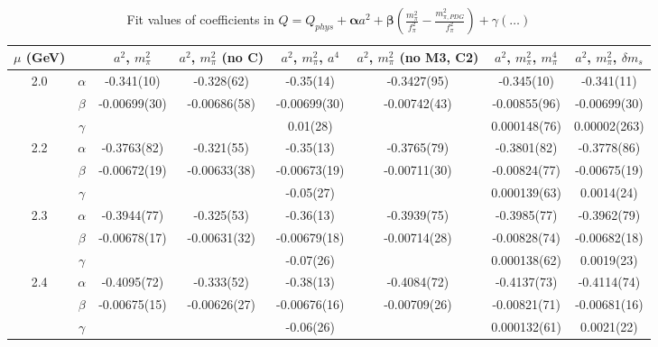 \documentclass[12pt]{extarticle}
\begin{document}
\begin{table}[h!]
\begin{center}
\begin{tabular}{|c c|c|c|c|c|c|c|}
\hline
$\mu$ (GeV) &  & $a^2$, $m_\pi^2$& $a^2$, $m_\pi^2$ (no C)& $a^2$, $m_\pi^2$, $a^4$& $a^2$, $m_\pi^2$ (no M3, C2)& $a^2$, $m_\pi^2$, $m_\pi^4$& $a^2$, $m_\pi^2$, $\delta m_s$\\
\hline
\multirow{3}{0.5in}{2.0} & $\alpha$ & -0.341(10)& -0.328(62)& -0.35(14)& -0.3427(95)& -0.345(10)& -0.341(11)\\
 & $\beta$ & -0.00699(30)& -0.00686(58)& -0.00699(30)& -0.00742(43)& -0.00855(96)& -0.00699(30)\\
 & $\gamma$ &  &  & 0.01(28)&  & 0.000148(76)& 0.00002(263)\\
\hline
\multirow{3}{0.5in}{2.2} & $\alpha$ & -0.3763(82)& -0.321(55)& -0.35(13)& -0.3765(79)& -0.3801(82)& -0.3778(86)\\
 & $\beta$ & -0.00672(19)& -0.00633(38)& -0.00673(19)& -0.00711(30)& -0.00824(77)& -0.00675(19)\\
 & $\gamma$ &  &  & -0.05(27)&  & 0.000139(63)& 0.0014(24)\\
\hline
\multirow{3}{0.5in}{2.3} & $\alpha$ & -0.3944(77)& -0.325(53)& -0.36(13)& -0.3939(75)& -0.3985(77)& -0.3962(79)\\
 & $\beta$ & -0.00678(17)& -0.00631(32)& -0.00679(18)& -0.00714(28)& -0.00828(74)& -0.00682(18)\\
 & $\gamma$ &  &  & -0.07(26)&  & 0.000138(62)& 0.0019(23)\\
\hline
\multirow{3}{0.5in}{2.4} & $\alpha$ & -0.4095(72)& -0.333(52)& -0.38(13)& -0.4084(72)& -0.4137(73)& -0.4114(74)\\
 & $\beta$ & -0.00675(15)& -0.00626(27)& -0.00676(16)& -0.00709(26)& -0.00821(71)& -0.00681(16)\\
 & $\gamma$ &  &  & -0.06(26)&  & 0.000132(61)& 0.0021(22)\\
\hline
\end{tabular}
\caption{Fit values of coefficients in $Q = Q_{phys} + \mathbf{\alpha} a^2 + \mathbf{\beta}\left(\frac{m_\pi^2}{f_\pi^2}-\frac{m_{\pi,PDG}^2}{f_\pi^2}\right) + \gamma(\ldots)$}
\end{center}
\end{table}





\end{document}
